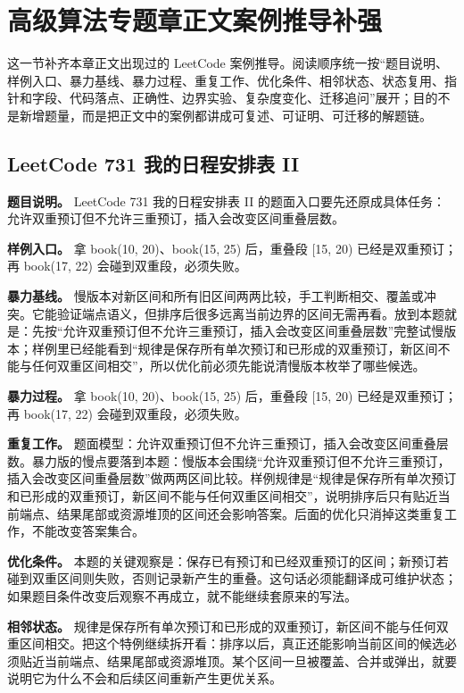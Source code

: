\section{高级算法专题章正文案例推导补强}

这一节补齐本章正文出现过的 LeetCode 案例推导。阅读顺序统一按“题目说明、样例入口、暴力基线、暴力过程、重复工作、优化条件、相邻状态、状态复用、指针和字段、代码落点、正确性、边界实验、复杂度变化、迁移追问”展开；目的不是新增题量，而是把正文中的案例都讲成可复述、可证明、可迁移的解题链。

\subsection{LeetCode 731 我的日程安排表 II}

\textbf{题目说明。} LeetCode 731 我的日程安排表 II 的题面入口要先还原成具体任务：允许双重预订但不允许三重预订，插入会改变区间重叠层数。

\textbf{样例入口。} 拿 book(10, 20)、book(15, 25) 后，重叠段 [15, 20) 已经是双重预订；再 book(17, 22) 会碰到双重段，必须失败。

\textbf{暴力基线。} 慢版本对新区间和所有旧区间两两比较，手工判断相交、覆盖或冲突。它能验证端点语义，但排序后很多远离当前边界的区间无需再看。放到本题就是：先按“允许双重预订但不允许三重预订，插入会改变区间重叠层数”完整试慢版本；样例里已经能看到“规律是保存所有单次预订和已形成的双重预订，新区间不能与任何双重区间相交”，所以优化前必须先能说清慢版本枚举了哪些候选。

\textbf{暴力过程。} 拿 book(10, 20)、book(15, 25) 后，重叠段 [15, 20) 已经是双重预订；再 book(17, 22) 会碰到双重段，必须失败。

\textbf{重复工作。} 题面模型：允许双重预订但不允许三重预订，插入会改变区间重叠层数。暴力版的慢点要落到本题：慢版本会围绕“允许双重预订但不允许三重预订，插入会改变区间重叠层数”做两两区间比较。样例规律是“规律是保存所有单次预订和已形成的双重预订，新区间不能与任何双重区间相交”，说明排序后只有贴近当前端点、结果尾部或资源堆顶的区间还会影响答案。后面的优化只消掉这类重复工作，不能改变答案集合。

\textbf{优化条件。} 本题的关键观察是：保存已有预订和已经双重预订的区间；新预订若碰到双重区间则失败，否则记录新产生的重叠。这句话必须能翻译成可维护状态；如果题目条件改变后观察不再成立，就不能继续套原来的写法。

\textbf{相邻状态。} 规律是保存所有单次预订和已形成的双重预订，新区间不能与任何双重区间相交。把这个特例继续拆开看：排序以后，真正还能影响当前区间的候选必须贴近当前端点、结果尾部或资源堆顶。某个区间一旦被覆盖、合并或弹出，就要说明它为什么不会和后续区间重新产生更优关系。

